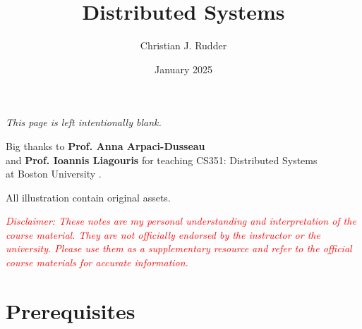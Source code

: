 \documentclass{memoir}
\title{Distributed Systems}
\author{Christian J. Rudder}
\date{January 2025}
\begin{document}
\maketitle
\setcounter{secnumdepth}{2}
\setcounter{tocdepth}{3}

\tableofcontents

\newpage
\thispagestyle{empty}
\mbox{}
\vfill
\begin{center}
    \textit{This page is left intentionally blank.}
\end{center}
\vfill
\newpage
\thispagestyle{empty}
\mbox{}
\vfill
\begin{center}
    \Large{Big thanks to \textbf{Prof. Anna Arpaci-Dusseau}}\\
    and  \textbf{Prof. Ioannis Liagouris}
    \normalsize 
    for teaching CS351: Distributed Systems\\
    at Boston University \cite{liagouris_cs351}.\\
\end{center}

\vfill

\begin{center}
    \noindent All illustration contain original assets.
\end{center}
    \begin{center}
        \textcolor{red}{\textit{Disclaimer: These notes are my personal understanding and interpretation of the course material. 
        They are not officially endorsed by the instructor or the university. Please use them as a supplementary resource and refer 
        to the official course materials for accurate information.}}
    \end{center}

    \chapter*{Prerequisites}
    
    
% 
% 
% 
% 
% 


% 
% 
\end{document}
